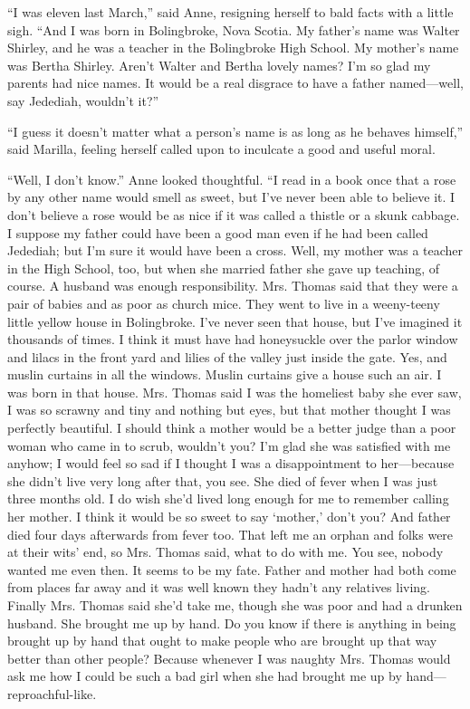 \documentclass[a4paper]{article}
\begin{document}
\huge{``I was eleven last March,'' said Anne, resigning herself to bald facts with a little sigh. ``And I was born in Bolingbroke, Nova Scotia. My father's name was Walter Shirley, and he was a teacher in the Bolingbroke High School. My mother's name was Bertha Shirley. Aren't Walter and Bertha lovely names? I'm so glad my parents had nice names. It would be a real disgrace to have a father named---well, say Jedediah, wouldn't it?''

``I guess it doesn't matter what a person's name is as long as he behaves himself,'' said Marilla, feeling herself called upon to inculcate a good and useful moral.

``Well, I don't know.'' Anne looked thoughtful. ``I read in a book once that a rose by any other name would smell as sweet, but I've never been able to believe it. I don't believe a rose would be as nice if it was called a thistle or a skunk cabbage. I suppose my father could have been a good man even if he had been called Jedediah; but I'm sure it would have been a cross. Well, my mother was a teacher in the High School, too, but when she married father she gave up teaching, of course. A husband was enough responsibility. Mrs. Thomas said that they were a pair of babies and as poor as church mice. They went to live in a weeny-teeny little yellow house in Bolingbroke. I've never seen that house, but I've imagined it thousands of times. I think it must have had honeysuckle over the parlor window and lilacs in the front yard and lilies of the valley just inside the gate. Yes, and muslin curtains in all the windows. Muslin curtains give a house such an air. I was born in that house. Mrs. Thomas said I was the homeliest baby she ever saw, I was so scrawny and tiny and nothing but eyes, but that mother thought I was perfectly beautiful. I should think a mother would be a better judge than a poor woman who came in to scrub, wouldn't you? I'm glad she was satisfied with me anyhow; I would feel so sad if I thought I was a disappointment to her---because she didn't live very long after that, you see. She died of fever when I was just three months old. I do wish she'd lived long enough for me to remember calling her mother. I think it would be so sweet to say `mother,' don't you? And father died four days afterwards from fever too. That left me an orphan and folks were at their wits' end, so Mrs. Thomas said, what to do with me. You see, nobody wanted me even then. It seems to be my fate. Father and mother had both come from places far away and it was well known they hadn't any relatives living. Finally Mrs. Thomas said she'd take me, though she was poor and had a drunken husband. She brought me up by hand. Do you know if there is anything in being brought up by hand that ought to make people who are brought up that way better than other people? Because whenever I was naughty Mrs. Thomas would ask me how I could be such a bad girl when she had brought me up by hand---reproachful-like.

}
\end{document}
